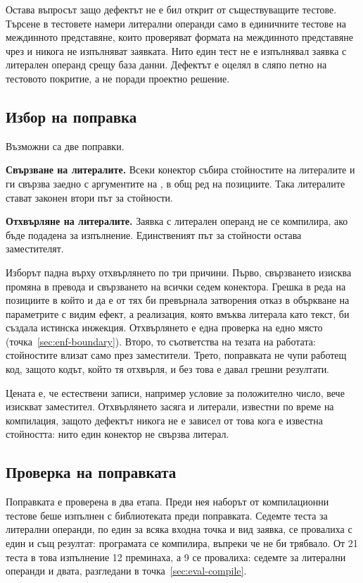 Остава въпросът защо дефектът не е бил открит от съществуващите тестове. Търсене
в тестовете намери литерални операнди само в единичните тестове на междинното
представяне, които проверяват формата на междинното представяне чрез
 и никога не изпълняват заявката. Нито един тест не е
изпълнявал заявка с литерален операнд срещу база данни. Дефектът е оцелял в
сляпо петно на тестовото покритие, а не поради проектно решение.

\subsection{Избор на поправка}
\label{sec:cs-fix}

Възможни са две поправки.

\textbf{Свързване на литералите.} Всеки конектор събира стойностите на
литералите и ги свързва заедно с аргументите на , в общ ред на
позициите. Така литералите стават законен втори път за стойности.

\textbf{Отхвърляне на литералите.} Заявка с литерален операнд не се компилира, ако
бъде подадена за изпълнение. Единственият път за стойности остава заместителят.

Изборът падна върху отхвърлянето по три причини. Първо, свързването изисква
промяна в превода и свързването на всички седем конектора. Грешка в реда на
позициите в който и да е от тях би превърнала затворения отказ в объркване на
параметрите с видим ефект, а реализация, която вмъква литерала като текст, би
създала истинска инжекция. Отхвърлянето е една проверка на едно място
(точка~\ref{sec:enf-boundary}). Второ, то съответства на тезата на работата:
стойностите влизат само през заместители. Трето, поправката не чупи работещ код,
защото кодът, който тя отхвърля, и без това е давал грешни резултати.

Цената е, че естествени записи, например условие за положително число, вече
изискват заместител. Отхвърлянето засяга и литерали, известни по време на
компилация, защото дефектът никога не е зависел от това кога е известна
стойността: нито един конектор не свързва литерал.

\subsection{Проверка на поправката}
\label{sec:cs-verification}

Поправката е проверена в два етапа. Преди нея наборът от компилационни тестове
беше изпълнен с библиотеката преди поправката. Седемте теста за
литерални операнди, по един за всяка входна точка и вид заявка, се провалиха с
един и същ резултат: програмата се компилира, въпреки че не би трябвало.
От 21 теста в това изпълнение 12 преминаха, а 9 се провалиха: седемте за
литерални операнди и двата, разгледани в точка~\ref{sec:eval-compile}.

